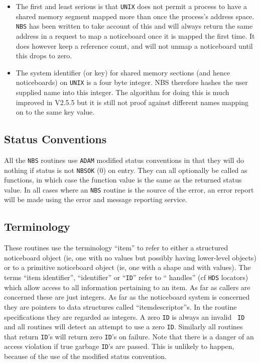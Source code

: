 \documentclass[twoside,11pt]{article}
\renewcommand{\_}{\texttt{\symbol{95}}}
\newcommand{\mantt}{\tt}
\begin{document}
\begin{itemize}
\item The first and least serious is that {\tt UNIX} does not permit
a process to have a shared memory segment mapped more than once
the process's address space. {\tt NBS} has been written to take
account of this and will always return the same address in a request
to map a noticeboard once it is mapped the first time. It does however
keep a reference count, and will not unmap a noticeboard until this
drops to zero.
\item The system identifier (or key) for shared memory sections (and hence
noticeboards) on {\tt UNIX} is a four byte integer. NBS therefore hashes
the user supplied name into this integer. The algorithm for doing this
is much improved in V2.5.5 but it is still not proof against different
names mapping on to the same key value.
\end{itemize}

      \subsection {Status Conventions} All the {\tt NBS} routines use {%
\tt ADAM} modified
      status conventions in that they will do nothing if status is not {%
\tt NBS\_\_OK}
      (0) on entry. They can all optionally be called as functions, in which
      case the function value is the same as the returned status value. In
      all cases where an {\tt NBS} routine is the source of the error, an
      error report will be made using the error and message reporting service.

      \subsection {Terminology} These routines use the terminology ``item'' to
      refer to either a structured noticeboard object (ie, one with no values
      but possibly having lower-level objects) or to a primitive noticeboard
      object (ie, one with a shape and with values). The terms
      ``item identifier'', ``identifier'' or ``{\tt ID}'' refer to ``%
handles'' (cf {\tt HDS}
      locators) which allow access to all information pertaining to an item. As
      far as callers are concerned these are just integers. As far as the
      noticeboard system is concerned they are pointers to data structures
      called ``item\_descriptor''s. In the routine specifications they are
      regarded as integers. A zero {\mantt{ID}} is always an invalid {\mantt{%
ID}} and all routines
      will detect an attempt to use a zero {\mantt{ID}}. Similarly all %
routines that
      return {\mantt{ID}}'s will return zero {\mantt{ID}}'s on failure. Note %
that there is a danger
      of an access violation if true garbage {\mantt{ID}}'s are passed. This %
is unlikely
      to happen, because of the use of the modified status convention.
\end{document}
